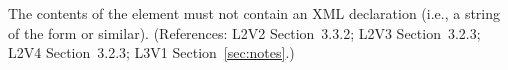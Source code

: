 The contents of the  element must not contain an XML
declaration (i.e., a string of the form  or similar).  (References: L2V2 Section~3.3.2;
L2V3 Section~3.2.3; L2V4 Section~3.2.3; L3V1 Section~\ref{sec:notes}.)
